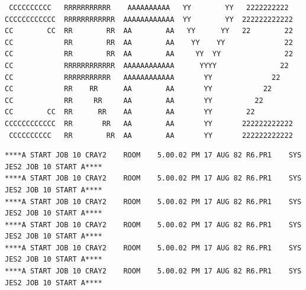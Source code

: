 \begin{verbatim}
 CCCCCCCCCC   RRRRRRRRRRR    AAAAAAAAAA   YY        YY   2222222222
CCCCCCCCCCCC  RRRRRRRRRRRR  AAAAAAAAAAAA  YY        YY  222222222222
CC        CC  RR        RR  AA        AA   YY      YY   22        22
CC            RR        RR  AA        AA    YY    YY              22
CC            RR        RR  AA        AA     YY  YY               22
CC            RRRRRRRRRRRR  AAAAAAAAAAAA      YYYY               22
CC            RRRRRRRRRRR   AAAAAAAAAAAA       YY              22
CC            RR    RR      AA        AA       YY            22
CC            RR     RR     AA        AA       YY          22
CC        CC  RR      RR    AA        AA       YY        22
CCCCCCCCCCCC  RR       RR   AA        AA       YY       222222222222
 CCCCCCCCCC   RR        RR  AA        AA       YY       222222222222
\end{verbatim}
\begin{verbatim}
****A START JOB 10 CRAY2    ROOM    5.00.02 PM 17 AUG 82 R6.PR1    SYS JES2 JOB 10 START A****
****A START JOB 10 CRAY2    ROOM    5.00.02 PM 17 AUG 82 R6.PR1    SYS JES2 JOB 10 START A****
****A START JOB 10 CRAY2    ROOM    5.00.02 PM 17 AUG 82 R6.PR1    SYS JES2 JOB 10 START A****
****A START JOB 10 CRAY2    ROOM    5.00.02 PM 17 AUG 82 R6.PR1    SYS JES2 JOB 10 START A****
****A START JOB 10 CRAY2    ROOM    5.00.02 PM 17 AUG 82 R6.PR1    SYS JES2 JOB 10 START A****
****A START JOB 10 CRAY2    ROOM    5.00.02 PM 17 AUG 82 R6.PR1    SYS JES2 JOB 10 START A****
\end{verbatim}
